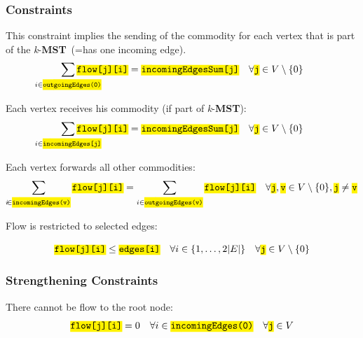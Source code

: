 \documentclass[,%
			paper=a4,%
			DIV14,
			liststotoc,
			bibtotoc,
			draft=false,%
			numbers=noendperiod
			]{scrartcl}
\newcommand{\mst}{\textbf{MST}}
\newcommand{\kmst}{\textit{k}-\mst}
\newcommand{\ilc}[1]{\hl{\texttt{#1}}} %
\newcommand{\commodity}{j}
\newcommand{\edge}{i}
\newcommand{\forallEdges}{\ensuremath{\forall \edge \in \{1, \dotsc, 2|E|\}}}
\begin{document}
\subsubsection{Constraints}

This constraint implies the sending of the commodity for each vertex that is part of the \kmst\ (=has one incoming edge).
\begin{equation}\label{eq:mfcSend}
	\sum_{\mathclap{\edge \in \ilc{outgoingEdges(0)}}} \ilc{flow[\commodity][\edge]} = \ilc{incomingEdgesSum[\commodity]}
\quad \forall \ilc{\commodity} \in V  \setminus \{0\}
\end{equation}

Each vertex receives his commodity (if part of \kmst):
\begin{equation}\label{eq:mfcRec}
	\sum_{\mathclap{\edge \in \ilc{incomingEdges[j]}}} \ilc{flow[\commodity][\edge]} 
 = \ilc{incomingEdgesSum[\commodity]}
\quad \forall \ilc{\commodity} \in V  \setminus \{0\}
\end{equation}

Each vertex forwards all other commodities:
\begin{equation}\label{eq:mfcForward}
\begin{split}
\sum_{\mathclap i \in \ilc{incomingEdges(v)}} \ilc{flow[\commodity][i]} = \sum_{ i \in \ilc{outgoingEdges(v)}} \ilc{flow[\commodity][i]} 
\quad \forall \ilc{\commodity}, \ilc{v} \in V  \setminus \{0\}
, \ilc{\commodity} \neq \ilc{v}
\end{split}
\end{equation}

Flow is restricted to selected edges:

\begin{equation}\label{eq:mfcFlowEdge}
 \ilc{flow[\commodity][\edge]} \leq \ilc{edges[\edge]}
 \quad \forallEdges 
\quad \forall \ilc{\commodity} \in V  \setminus \{0\}
\end{equation}

\subsubsection{Strengthening Constraints}

There cannot be flow to the root node:
\begin{equation}\label{eq:mfcNoFlow}
 \ilc{flow[\commodity][i]} = 0
\quad \forall i \in \ilc{incomingEdges(0)}  
\quad \forall \ilc{\commodity} \in V
\end{equation}
\end{document}

